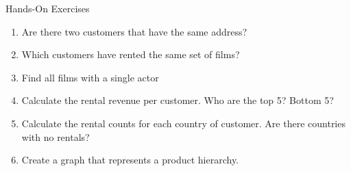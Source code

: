 \documentclass[ignorenonframetext,xcolor=x11names]{beamer}
\begin{document}
\begin{frame}{Hands-On Exercises}
\begin{enumerate}
	\item Are there two customers that have the same address?
	\item Which customers have rented the same set of films?
	\item Find all films with a single actor
	\item Calculate the rental revenue per customer. Who are the top 5? Bottom 5?
	\item Calculate the rental counts for each country of customer. Are there countries with no rentals?
	\item Create a graph that represents a product hierarchy.
\end{enumerate}
\end{frame}
\end{document}
